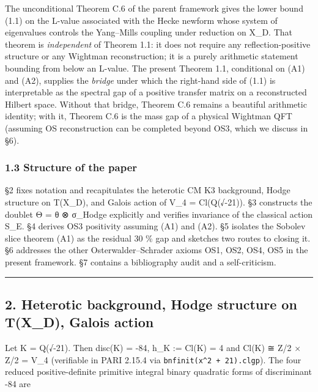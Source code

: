 \documentclass[
 11pt,
 a4paper,
]{article}
\begin{document}
The unconditional Theorem C.6 of the parent framework gives the lower bound (1.1) on the L-value associated with the Hecke newform whose system of eigenvalues controls the Yang--Mills coupling under reduction on X\_D. That theorem is \emph{independent} of Theorem 1.1: it does not require any reflection-positive structure or any Wightman reconstruction; it is a purely arithmetic statement bounding from below an L-value. The present Theorem 1.1, conditional on (A1) and (A2), supplies the \emph{bridge} under which the right-hand side of (1.1) is interpretable as the spectral gap of a positive transfer matrix on a reconstructed Hilbert space. Without that bridge, Theorem C.6 remains a beautiful arithmetic identity; with it, Theorem C.6 is the mass gap of a physical Wightman QFT (assuming OS reconstruction can be completed beyond OS3, which we discuss in §6).

\hypertarget{structure-of-the-paper}{%
\subsubsection{1.3 Structure of the paper}\label{structure-of-the-paper}}

§2 fixes notation and recapitulates the heterotic CM K3 background, Hodge structure on T(X\_D), and Galois action of V\_4 = Cl(Q(√-21)). §3 constructs the doublet Θ = θ ⊗ σ\_Hodge explicitly and verifies invariance of the classical action S\_E. §4 derives OS3 positivity assuming (A1) and (A2). §5 isolates the Sobolev slice theorem (A1) as the residual 30 \% gap and sketches two routes to closing it. §6 addresses the other Osterwalder--Schrader axioms OS1, OS2, OS4, OS5 in the present framework. §7 contains a bibliography audit and a self-criticism.

\begin{center}\rule{0.5\linewidth}{0.5pt}\end{center}

\hypertarget{heterotic-background-hodge-structure-on-tx_d-galois-action}{%
\subsection{2. Heterotic background, Hodge structure on T(X\_D), Galois action}\label{heterotic-background-hodge-structure-on-tx_d-galois-action}}

Let K = Q(√-21). Then disc(K) = -84, h\_K := \textbar Cl(K)\textbar{} = 4 and Cl(K) ≅ Z/2 × Z/2 = V\_4 (verifiable in PARI 2.15.4 via \texttt{bnfinit(x\^{}2\ +\ 21).clgp}). The four reduced positive-definite primitive integral binary quadratic forms of discriminant -84 are
\end{document}
